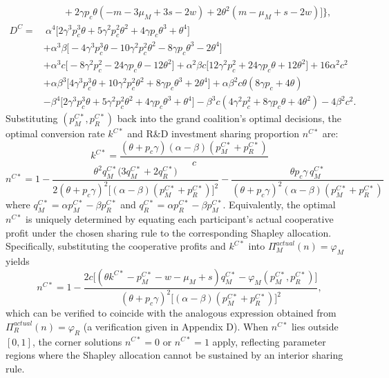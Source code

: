\documentclass[authoryear,preprint,review,times,10pt]{elsarticle}
\begin{document}
\begin{prop}
\begin{equation}
\begin{aligned}
&\qquad + 2\gamma p_{c}\theta(-m - 3\mu_{M} + 3s - 2w) + 2\theta^{2}(m - \mu_{M} + s - 2w)\big] \big\}, \\[3pt]
D^{C} =&\ \alpha^{4}\big[2\gamma^{3} p_{c}^{3}\theta + 5\gamma^{2} p_{c}^{2}\theta^{2} + 4\gamma p_{c}\theta^{3} + \theta^{4}\big] \\
&+ \alpha^{3}\beta\big[-4\gamma^{3} p_{c}^{3}\theta - 10\gamma^{2} p_{c}^{2}\theta^{2} - 8\gamma p_{c}\theta^{3} - 2\theta^{4}\big] \\
&+ \alpha^{3} c\big[-8\gamma^{2} p_{c}^{2} - 24\gamma p_{c}\theta - 12\theta^{2}\big] + \alpha^{2}\beta c\big[12\gamma^{2} p_{c}^{2} + 24\gamma p_{c}\theta + 12\theta^{2}\big] + 16\alpha^{2} c^{2} \\
&+ \alpha\beta^{3}\big[4\gamma^{3} p_{c}^{3}\theta + 10\gamma^{2} p_{c}^{2}\theta^{2} + 8\gamma p_{c}\theta^{3} + 2\theta^{4}\big] + \alpha\beta^{2} c\theta(8\gamma p_{c} + 4\theta) \\
&- \beta^{4}\big[2\gamma^{3} p_{c}^{3}\theta + 5\gamma^{2} p_{c}^{2}\theta^{2} + 4\gamma p_{c}\theta^{3} + \theta^{4}\big] - \beta^{3} c(4\gamma^{2} p_{c}^{2} + 8\gamma p_{c}\theta + 4\theta^{2}) - 4\beta^{2} c^{2}.
\end{aligned}
\tag{C1}
\end{equation}
Substituting $(p_M^{C*}, p_R^{C*})$ back into the grand coalition's optimal decisions, the optimal conversion rate $k^{C*}$ and R\&D investment sharing proportion $n^{C*}$ are:
\begin{equation}
k^{C*} = \frac{(\theta + p_c \gamma)(\alpha-\beta)(p_M^{C*} + p_R^{C*})}{c}
\end{equation}
\begin{equation}
n^{C*} = 1 - \frac{\theta^{2} q_M^{C*}\big(3 q_M^{C*} + 2 q_R^{C*}\big)}{2(\theta + p_c \gamma)^{2} \big[(\alpha-\beta)(p_M^{C*} + p_R^{C*})\big]^{2}} - \frac{\theta p_c \gamma \, q_M^{C*}}{(\theta + p_c \gamma)^{2} (\alpha-\beta)(p_M^{C*} + p_R^{C*})}
\end{equation}
where $q_{M}^{C*} = \alpha p_M^{C*} - \beta p_R^{C*}$ and $q_{R}^{C*} = \alpha p_R^{C*} - \beta p_M^{C*}$. Equivalently, the optimal $n^{C*}$ is uniquely determined by equating each participant's actual cooperative profit under the chosen sharing rule to the corresponding Shapley allocation. Specifically, substituting the cooperative profits and $k^{C*}$ into $\Pi_M^{actual}(n) = \varphi_M$ yields
\begin{equation}
n^{C*} = 1 - \frac{2c \big[(\theta k^{C*} - p_M^{C*} - w - \mu_M + s) q_M^{C*} - \varphi_M(p_M^{C*}, p_R^{C*})\big]}{(\theta + p_c \gamma)^2 \big[(\alpha - \beta)(p_M^{C*} + p_R^{C*})\big]^2},
\end{equation}
which can be verified to coincide with the analogous expression obtained from $\Pi_R^{actual}(n) = \varphi_R$ (a verification given in Appendix D). When $n^{C*}$ lies outside $[0,1]$, the corner solutions $n^{C*} = 0$ or $n^{C*} = 1$ apply, reflecting parameter regions where the Shapley allocation cannot be sustained by an interior sharing rule.
\end{prop}
\end{document}
